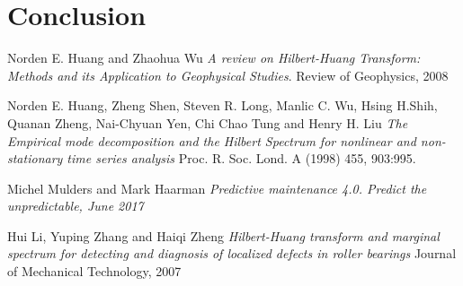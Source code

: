 \documentclass[11pt, oneside]{article}   	%
\begin{document}
\section{Conclusion}
\begin{thebibliography}{9}
Norden E. Huang and Zhaohua Wu 
\textit{A review on Hilbert-Huang Transform: Methods and its Application to Geophysical Studies}. 
Review of Geophysics, 2008
 
Norden E. Huang, Zheng Shen, Steven R. Long, Manlic C. Wu, Hsing H.Shih, Quanan Zheng, Nai-Chyuan Yen, Chi Chao Tung and Henry H. Liu
\textit{The Empirical mode decomposition and the Hilbert Spectrum for nonlinear and non-stationary time series analysis}
Proc. R. Soc. Lond. A (1998) 455, 903:995.


 
Michel Mulders and Mark Haarman
\textit{Predictive maintenance 4.0. Predict the unpredictable, June 2017}

 
Hui Li, Yuping Zhang and Haiqi Zheng
\textit{Hilbert-Huang transform and marginal spectrum for detecting and diagnosis of localized defects in roller bearings}
Journal of Mechanical Technology, 2007
\end{thebibliography}
\end{document}
